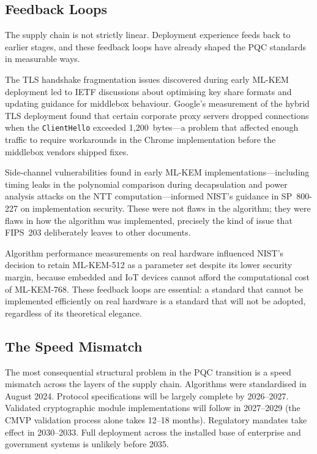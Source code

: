 \subsection{Feedback Loops}
\label{subsec:feedback-loops}

The supply chain is not strictly linear. Deployment experience feeds back to earlier stages, and these feedback loops have already shaped the PQC standards in measurable ways.

The TLS handshake fragmentation issues discovered during early ML-KEM deployment led to IETF discussions about optimising key share formats and updating guidance for middlebox behaviour. Google's measurement of the hybrid TLS deployment found that certain corporate proxy servers dropped connections when the \texttt{ClientHello} exceeded 1,200~bytes---a problem that affected enough traffic to require workarounds in the Chrome implementation before the middlebox vendors shipped fixes.

Side-channel vulnerabilities found in early ML-KEM implementations---including timing leaks in the polynomial comparison during decapsulation and power analysis attacks on the NTT computation---informed NIST's guidance in SP~800-227 on implementation security. These were not flaws in the algorithm; they were flaws in how the algorithm was implemented, precisely the kind of issue that FIPS~203 deliberately leaves to other documents.

Algorithm performance measurements on real hardware influenced NIST's decision to retain ML-KEM-512 as a parameter set despite its lower security margin, because embedded and IoT devices cannot afford the computational cost of ML-KEM-768. These feedback loops are essential: a standard that cannot be implemented efficiently on real hardware is a standard that will not be adopted, regardless of its theoretical elegance.

\subsection{The Speed Mismatch}
\label{subsec:speed-mismatch}

The most consequential structural problem in the PQC transition is a speed mismatch across the layers of the supply chain. Algorithms were standardised in August 2024. Protocol specifications will be largely complete by 2026--2027. Validated cryptographic module implementations will follow in 2027--2029 (the CMVP validation process alone takes 12--18 months). Regulatory mandates take effect in 2030--2033. Full deployment across the installed base of enterprise and government systems is unlikely before 2035.

